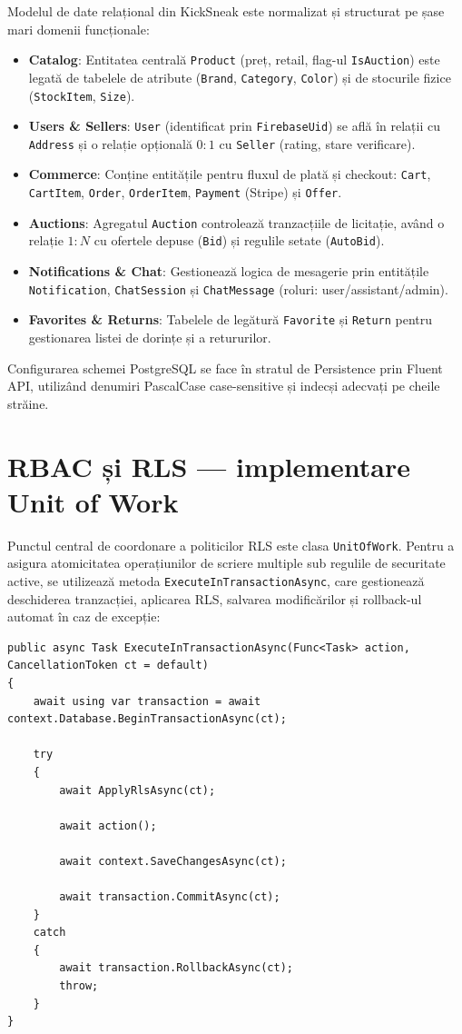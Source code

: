 Modelul de date relațional din KickSneak este normalizat și structurat pe șase mari domenii funcționale:
\begin{itemize}
    \item \textbf{Catalog}: Entitatea centrală \texttt{Product} (preț, retail, flag-ul \texttt{IsAuction}) este legată de tabelele de atribute (\texttt{Brand}, \texttt{Category}, \texttt{Color}) și de stocurile fizice (\texttt{StockItem}, \texttt{Size}).
    \item \textbf{Users \& Sellers}: \texttt{User} (identificat prin \texttt{FirebaseUid}) se află în relații cu \texttt{Address} și o relație opțională $0:1$ cu \texttt{Seller} (rating, stare verificare).
    \item \textbf{Commerce}: Conține entitățile pentru fluxul de plată și checkout: \texttt{Cart}, \texttt{CartItem}, \texttt{Order}, \texttt{OrderItem}, \texttt{Payment} (Stripe) și \texttt{Offer}.
    \item \textbf{Auctions}: Agregatul \texttt{Auction} controlează tranzacțiile de licitație, având o relație $1:N$ cu ofertele depuse (\texttt{Bid}) și regulile setate (\texttt{AutoBid}).
    \item \textbf{Notifications \& Chat}: Gestionează logica de mesagerie prin entitățile \texttt{Notification}, \texttt{ChatSession} și \texttt{ChatMessage} (roluri: user/assistant/admin).
    \item \textbf{Favorites \& Returns}: Tabelele de legătură \texttt{Favorite} și \texttt{Return} pentru gestionarea listei de dorințe și a retururilor.
\end{itemize}

Configurarea schemei PostgreSQL se face în stratul de Persistence prin Fluent API, utilizând denumiri PascalCase case-sensitive și indecși adecvați pe cheile străine.

\section{RBAC și RLS --- implementare Unit of Work}

Punctul central de coordonare a politicilor RLS este clasa \texttt{UnitOfWork}. Pentru a asigura atomicitatea operațiunilor de scriere multiple sub regulile de securitate active, se utilizează metoda \texttt{ExecuteInTransactionAsync}, care gestionează deschiderea tranzacției, aplicarea RLS, salvarea modificărilor și rollback-ul automat în caz de excepție:

\begin{lstlisting}[language={[sharp]C}]
public async Task ExecuteInTransactionAsync(Func<Task> action, CancellationToken ct = default)
{
    await using var transaction = await context.Database.BeginTransactionAsync(ct);

    try
    {
        await ApplyRlsAsync(ct);

        await action();

        await context.SaveChangesAsync(ct);

        await transaction.CommitAsync(ct);
    }
    catch
    {
        await transaction.RollbackAsync(ct);
        throw;
    }
}
\end{lstlisting}

